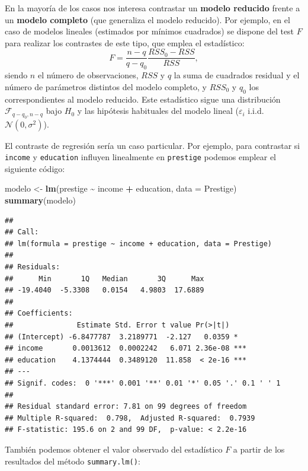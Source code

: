 \documentclass[
]{book}
\newenvironment{Shaded}{\begin{snugshade}}{\end{snugshade}}
\newcommand{\AttributeTok}[1]{\textcolor[rgb]{0.13,0.29,0.53}{#1}}
\newcommand{\FunctionTok}[1]{\textcolor[rgb]{0.13,0.29,0.53}{\textbf{#1}}}
\newcommand{\NormalTok}[1]{#1}
\newcommand{\OtherTok}[1]{\textcolor[rgb]{0.56,0.35,0.01}{#1}}
\newcommand{\SpecialCharTok}[1]{\textcolor[rgb]{0.81,0.36,0.00}{\textbf{#1}}}
\theoremstyle{break}
\theoremstyle{nonumberplain}
\begin{document}
En la mayoría de los casos nos interesa contrastar un \textbf{modelo reducido}
frente a un \textbf{modelo completo} (que generaliza el modelo reducido).
Por ejemplo, en el caso de modelos lineales (estimados por mínimos cuadrados)
se dispone del test \(F\) para realizar los contrastes de este tipo,
que emplea el estadístico:
\[F=\frac{n - q}{q - q_0}\frac{RSS_0 - RSS}{RSS},\]
siendo \(n\) el número de observaciones, \(RSS\) y \(q\) la suma de cuadrados residual y
el número de parámetros distintos del modelo completo,
y \(RSS_0\) y \(q_0\) los correspondientes al modelo reducido.
Este estadístico sigue una distribución \(\mathcal{F}_{q - q_0, n - q}\)
bajo \(H_0\) y las hipótesis habituales del modelo lineal
(\(\varepsilon_i\) i.i.d. \(\mathcal{N}(0, \sigma^2)\)).

El contraste de regresión sería un caso particular. Por ejemplo,
para contrastar si \texttt{income} y \texttt{education} influyen linealmente en \texttt{prestige}
podemos emplear el siguiente código:

\begin{Shaded}
\begin{Highlighting}[]
\NormalTok{modelo }\OtherTok{\textless{}{-}} \FunctionTok{lm}\NormalTok{(prestige }\SpecialCharTok{\textasciitilde{}}\NormalTok{ income }\SpecialCharTok{+}\NormalTok{ education, }\AttributeTok{data =}\NormalTok{ Prestige)}
\FunctionTok{summary}\NormalTok{(modelo)}
\end{Highlighting}
\end{Shaded}

\begin{verbatim}
## 
## Call:
## lm(formula = prestige ~ income + education, data = Prestige)
## 
## Residuals:
##      Min       1Q   Median       3Q      Max 
## -19.4040  -5.3308   0.0154   4.9803  17.6889 
## 
## Coefficients:
##               Estimate Std. Error t value Pr(>|t|)    
## (Intercept) -6.8477787  3.2189771  -2.127   0.0359 *  
## income       0.0013612  0.0002242   6.071 2.36e-08 ***
## education    4.1374444  0.3489120  11.858  < 2e-16 ***
## ---
## Signif. codes:  0 '***' 0.001 '**' 0.01 '*' 0.05 '.' 0.1 ' ' 1
## 
## Residual standard error: 7.81 on 99 degrees of freedom
## Multiple R-squared:  0.798,  Adjusted R-squared:  0.7939 
## F-statistic: 195.6 on 2 and 99 DF,  p-value: < 2.2e-16
\end{verbatim}

También podemos obtener el valor observado del estadístico \(F\)
a partir de los resultados del método \texttt{summary.lm()}:
\end{document}
